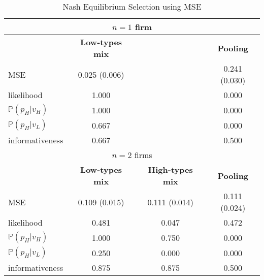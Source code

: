 
\begin{table}[htbp]
\renewcommand{\arraystretch}{1}
\begin{tabular}{lccc}
\toprule
\multicolumn{4}{c}{$n = 1$ firm} \\
\midrule 
& \textbf{Low-types mix} &  & \textbf{Pooling} \\
\cmidrule(lr){2-2} \cmidrule(lr){4-4} 
MSE & 0.025 (0.006) &  & 0.241 (0.030) \\
likelihood & 1.000 &  & 0.000 \\
$\mathbb{P}(p_H|v_H)$ & 1.000 &  & 0.000 \\
$\mathbb{P}(p_H|v_L)$ & 0.667 &  & 0.000 \\
informativeness & 0.667 &  & 0.500 \\
\midrule
\multicolumn{4}{c}{$n = 2$ firms} \\
\midrule 
& \textbf{Low-types mix} & \textbf{High-types mix} & \textbf{Pooling} \\
\cmidrule(lr){2-2} \cmidrule(lr){3-3} \cmidrule(lr){4-4}
MSE & 0.109 (0.015) & 0.111 (0.014) & 0.111 (0.024) \\
likelihood & 0.481 & 0.047 & 0.472 \\
$\mathbb{P}(p_H|v_H)$ & 1.000 & 0.750 & 0.000 \\
$\mathbb{P}(p_H|v_L)$ & 0.250 & 0.000 & 0.000 \\
informativeness & 0.875 & 0.875 & 0.500 \\
\bottomrule
\end{tabular}
\caption{Nash Equilibrium Selection using MSE}
\label{mse_table}
\end{table}
